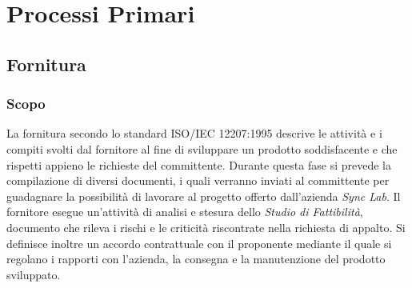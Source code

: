 \chapter{Processi Primari}\label{ProcessiPrimari}
\section{Fornitura}\label{2.1}
\subsection{Scopo}\label{2.1.1}
La fornitura secondo lo standard ISO/IEC 12207:1995 descrive le attività e i compiti svolti dal fornitore al fine di sviluppare un prodotto soddisfacente e che rispetti appieno le richieste del committente.
Durante questa fase si prevede la compilazione di diversi documenti, i quali verranno inviati al committente per guadagnare la possibilità di lavorare al progetto offerto dall'azienda \textit{Sync Lab}.
Il fornitore esegue un'attività di analisi e stesura dello \textit{Studio di Fattibilità}, documento che rileva i rischi e le criticità riscontrate nella richiesta di appalto.
Si definisce inoltre un accordo contrattuale con il proponente mediante il quale si regolano i rapporti con l'azienda, la consegna e la manutenzione del prodotto sviluppato. 

